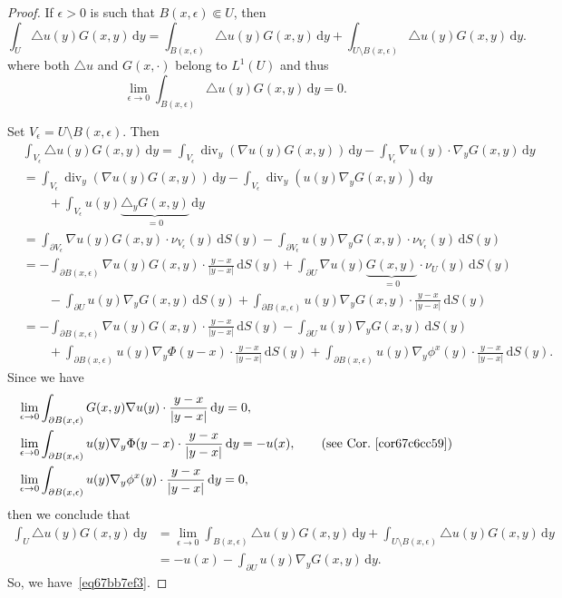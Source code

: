\documentclass[a4paper,9pt]{amsart}
\newcommand{\did}{\,\mathrm{d}}	%
\newcommand{\de}{\partial}		%
\renewcommand{\div}{\operatorname{div}}	%
\newcommand{\laplacian}{\triangle}
\newcommand{\grad}{\nabla}
\theoremstyle{plain}
\theoremstyle{definition}
\theoremstyle{remark}
\begin{document}
\begin{proof}
	If $\epsilon>0$ is such that $B(x,\epsilon)\Subset U$, then
	\[
	\int_U \laplacian u(y) G(x,y) \did y
	= \int_{B(x,\epsilon)} \laplacian u(y) G(x,y) \did y
		+ \int_{U\setminus B(x,\epsilon)} \laplacian u(y) G(x,y) \did y .
	\]
	where both $\laplacian u$ and $G(x,\cdot)$ belong to $L^1(U)$ 
	and thus 
	\[
	\lim_{\epsilon\to0} \int_{B(x,\epsilon)} \laplacian u(y) G(x,y) \did y = 0 .
	\]
	
	Set $V_\epsilon = U\setminus B(x,\epsilon)$.
	Then
	\begin{align*}
		&\int_{V_\epsilon} \laplacian u(y) G(x,y) \did y
		= \int_{V_\epsilon} \div_y(\grad u(y) G(x,y)) \did y
			- \int_{V_\epsilon} \grad u(y) \cdot \grad_y G(x,y) \did y \\
		&= \int_{V_\epsilon} \div_y(\grad u(y) G(x,y)) \did y
			- \int_{V_\epsilon} \div_y( u(y)  \grad_y G(x,y) ) \did y \\
		&\qquad 
			+ \int_{V_\epsilon} u(y)  \underbrace{\laplacian_y G(x,y)}_{=0} \did y \\
		&= \int_{\de V_\epsilon} \grad u(y) G(x,y)\cdot\nu_{V_\epsilon}(y) \did S(y)
			- \int_{\de V_\epsilon} u(y)  \grad_y G(x,y)\cdot\nu_{V_\epsilon}(y) \did S(y) \\
		&= - \int_{\de B(x,\epsilon)} \grad u(y) G(x,y) \cdot\frac{y-x}{|y-x|} \did S(y)
			+ \int_{\de U} \grad u(y) \underbrace{G(x,y)}_{=0} \cdot\nu_U(y) \did S(y) \\
		&\qquad
			- \int_{\de U} u(y) \grad_y G(x,y) \did S(y) 
			+ \int_{\de B(x,\epsilon)} u(y) \grad_y G(x,y)\cdot\frac{y-x}{|y-x|} \did S(y) \\
		&= - \int_{\de B(x,\epsilon)} \grad u(y) G(x,y) \cdot\frac{y-x}{|y-x|} \did S(y)
			- \int_{\de U} u(y) \grad_y G(x,y) \did S(y) \\ 
		&\qquad
			+ \int_{\de B(x,\epsilon)} u(y) \grad_y \Phi(y-x)\cdot\frac{y-x}{|y-x|} \did S(y) 
			+ \int_{\de B(x,\epsilon)} u(y) \grad_y \phi^x(y)\cdot\frac{y-x}{|y-x|} \did S(y) .
	\end{align*}
	Since we have
	\begin{align}
	\label{eq67c2ccf1}
		&\lim_{\epsilon\to0}
			\int_{\de B(x,\epsilon)}  G(x,y) \grad u(y)\cdot\frac{y-x}{|y-x|} \did y 
			= 0 ,\\
	\label{eq67c2ccfa}
		&\lim_{\epsilon\to0}
			\int_{\de B(x,\epsilon)} u(y) \grad_y \Phi(y-x)\cdot\frac{y-x}{|y-x|} \did y 
			= -u(x) ,
			\qquad\text{(see~Cor.~\ref{cor67c6cc59})}
			\\
	\label{eq67c2cd00}
		&\lim_{\epsilon\to0}
			\int_{\de B(x,\epsilon)} u(y) \grad_y \phi^x(y)\cdot\frac{y-x}{|y-x|} \did y 
			=0 ,
	\end{align}
	then we conclude that
	\begin{align*}
		\int_U \laplacian u(y) G(x,y) \did y
		&= \lim_{\epsilon\to0} \int_{B(x,\epsilon)} \laplacian u(y) G(x,y) \did y
			+ \int_{U\setminus B(x,\epsilon)} \laplacian u(y) G(x,y) \did y \\
		&= - u(x) - \int_{\de U} u(y) \grad_y G(x,y) \did y .
	\end{align*}
	So, we have~\eqref{eq67bb7ef3}.
\end{proof}
\end{document}
